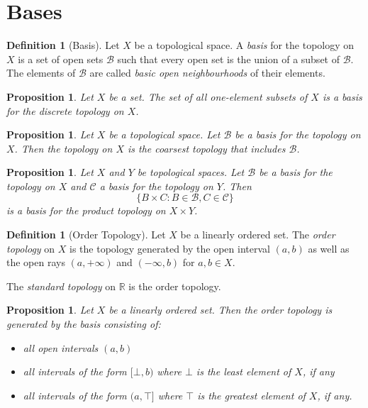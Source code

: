 \documentclass{book}
\newtheorem{prop}[ax]{Proposition}
\theoremstyle{definition}
\newtheorem{df}[ax]{Definition}
\begin{document}
\section{Bases}

\begin{df}[Basis]
Let $X$ be a topological space. A \emph{basis} for the topology on $X$ is a set of open sets $\mathcal{B}$ such that every open set is the union of a subset of $\mathcal{B}$. The elements of $\mathcal{B}$ are called \emph{basic open neighbourhoods} of their elements.
\end{df}

\begin{prop}
Let $X$ be a set. The set of all one-element subsets of $X$ is a basis for the discrete topology on $X$.
\end{prop}

\begin{prop}
Let $X$ be a topological space.
Let $\mathcal{B}$ be a basis for the topology on $X$.
Then the topology on $X$ is the coarsest topology that includes $\mathcal{B}$.
\end{prop}

\begin{prop}
Let $X$ and $Y$ be topological spaces. Let $\mathcal{B}$ be a basis for the topology on $X$ and $\mathcal{C}$ a basis for the topology on $Y$. Then
\[ \{ B \times C : B \in \mathcal{B}, C \in \mathcal{C} \} \]
is a basis for the product topology on $X \times Y$.
\end{prop}

\begin{df}[Order Topology]
Let $X$ be a linearly ordered set. The \emph{order topology} on $X$ is the topology generated by the open interval $(a,b)$ as well as the open rays $(a, + \infty)$ and $(-\infty, b)$ for $a,b \in X$.

The \emph{standard topology} on $\mathbb{R}$ is the order topology.
\end{df}

\begin{prop}
Let $X$ be a linearly ordered set. Then the order topology is generated by the basis consisting of:
\begin{itemize}
\item all open intervals $(a,b)$
\item all intervals of the form $[\bot, b)$ where $\bot$ is the least element of $X$, if any
\item all intervals of the form $(a, \top]$ where $\top$ is the greatest element of $X$, if any.
\end{itemize}
\end{prop}
\end{document}
